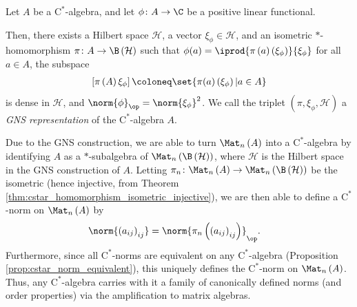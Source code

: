 \begin{theorem}\label{thm:gns_construction}
  Let $A$ be a $\mathrm{C}^{\ast}$-algebra, and let $\phi\colon A\rightarrow \C$ be a positive linear functional.\newline

  Then, there exists a Hilbert space $\mathcal{H}$, a vector $\xi_{\phi}\in \mathcal{H}$, and an isometric $\ast$-homomorphism $\pi\colon A\rightarrow \B\left( \mathcal{H} \right)$ such that $\phi(a) = \iprod{\pi\left( a \right)\left( \xi_{\phi} \right)}{\xi_{\phi}}$ for all $a\in A$, the subspace
  \begin{align*}
    \left[ \pi\left( A \right)\xi_{\phi} \right] \coloneq \set{\pi(a)\left( \xi_{\phi} \right) | a\in A}
  \end{align*}
  is dense in $\mathcal{H}$, and $\norm{\phi}_{\op} = \norm{\xi_{\phi}}^2$. We call the triplet $\left( \pi,\xi_{\phi},\mathcal{H} \right)$ a \textit{GNS representation} of the $\mathrm{C}^{\ast}$-algebra $A$.
\end{theorem}
Due to the GNS construction, we are able to turn $\Mat_n\left( A \right)$ into a $\mathrm{C}^{\ast}$-algebra by identifying $A$ as a $\ast$-subalgebra of $\Mat_n\left( \B\left( \mathcal{H} \right) \right)$, where $\mathcal{H}$ is the Hilbert space in the GNS construction of $A$. Letting $\pi_{n}\colon \Mat_n\left( A \right)\rightarrow \Mat_n\left( \B\left( \mathcal{H} \right) \right)$ be the isometric (hence injective, from Theorem \ref{thm:cstar_homomorphism_isometric_injective}), we are then able to define a $\mathrm{C}^{\ast}$-norm on $\Mat_n\left( A \right)$ by
\begin{align*}
  \norm{\left( a_{ij} \right)_{ij}} &= \norm{\pi_n\left( \left( a_{ij} \right)_{ij} \right)}_{\op}.
\end{align*}
Furthermore, since all $\mathrm{C}^{\ast}$-norms are equivalent on any $\mathrm{C}^{\ast}$-algebra (Proposition \ref{prop:cstar_norm_equivalent}), this uniquely defines the $\mathrm{C}^{\ast}$-norm on $\Mat_n\left( A \right)$. Thus, any $\mathrm{C}^{\ast}$-algebra carries with it a family of canonically defined norms (and order properties) via the amplification to matrix algebras.
